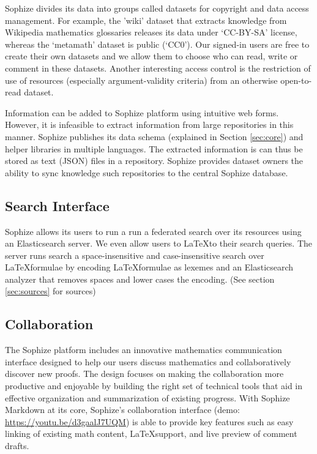 \documentclass[runningheads]{llncs}
\begin{document}
Sophize divides its data into groups called datasets for copyright and data access management. For example, the 'wiki' dataset that extracts knowledge from Wikipedia mathematics glossaries releases its data under `CC-BY-SA' license, whereas the `metamath' dataset is public (`CC0'). Our signed-in users are free to create their own datasets and we allow them to choose who can read, write or comment in these datasets. Another interesting access control is the restriction of use of resources (especially argument-validity criteria) from an otherwise open-to-read dataset.

Information can be added to Sophize platform using intuitive web forms. However, it is infeasible to extract information from large repositories in this manner. Sophize publishes its data schema (explained in Section \ref{sec:core}) and helper libraries in multiple languages. The extracted information is can thus be stored as text (JSON) files in a repository. Sophize provides dataset owners the ability to sync knowledge such repositories to the central Sophize database.

\subsection{Search Interface}
\label{sec:search}
Sophize allows its users to run a run a federated search over its resources using an Elasticsearch server. We even allow users to \LaTeX to their search queries. The server runs search a space-insensitive and case-insensitive search over \LaTeX\space formulae by encoding \LaTeX\space formulae as lexemes and an Elasticsearch analyzer that removes spaces and lower cases the encoding. (See section \ref{sec:sources} for sources)

\subsection{Collaboration}

The Sophize platform includes an innovative mathematics communication interface designed to help our users discuss mathematics and collaboratively discover new proofs. The design focuses on making the collaboration more productive and enjoyable by building the right set of technical tools that aid in effective organization and summarization of existing progress. With Sophize Markdown at its core, Sophize's collaboration interface\cite{EasyChair6207}  (demo: \url{https://youtu.be/d3gaalJ7UQM}) is able to provide key features such as easy linking of existing math content, \LaTeX\space support, and live preview of comment drafts.
\end{document}
